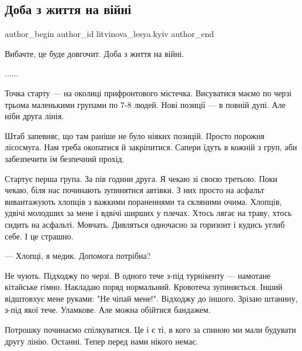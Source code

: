  
 
 
 
 

\subsection{Доба з  життя на війні}
\label{sec:27_05_2023.fb.litvinova_lesya.kyiv.1.doba_z_zhyttja_na_vijni}

\ifcmt
 author_begin
   author_id litvinova_lesya.kyiv
 author_end
\fi

Вибачте, це буде довгочит. Доба з  життя на війні.

......

Точка  старту  —   на околиці прифронтового  містечка.  Висуватися маємо  по
черзі трьома маленькими групами по  7-8 людей. Нові позиції —  в повній  дупі.
Але ніби друга лінія.  

Штаб запевняє,  що там раніше не було ніяких позицій. Просто порожня лісосмуга.
Нам треба окопатися й закріпитися. Сапери їдуть в кожній з груп, аби
забезпечити їм безпечний прохід. 

Стартує перша  група. За пів години  друга. Я чекаю зі своєю третьою.  Поки
чекаю, біля нас починають зупинятися  автівки. З них просто на асфальт
вивантажують хлопців з важкими пораненнями та скляними очима. Хлопців, удвічі
молодших за мене і вдвічі ширших у плечах. Хтось лягає на траву, хтось сидить
на асфальті.  Мовчать. Дивляться одночасно за горизонт і кудись углиб себе. І
це страшно. 

— Хлопці, я медик. Допомога потрібна?

Не чують. Підходжу по черзі.  В одного тече з-під турнікенту — намотане
кітайське гімно. Накладаю поряд нормальний. Кровотеча зупиняється. Інший
відштовхує мене руками: "Не чіпай мене!". Відходжу до іншого. Зрізаю штанину,
з-під якої тече. Уламкове. Але можна обійтися бандажем.  

Потрошку починаємо спілкуватися. Це і є ті, в кого за спиною ми мали будувати
другу лінію. Останні. Тепер перед нами нікого немає. 

